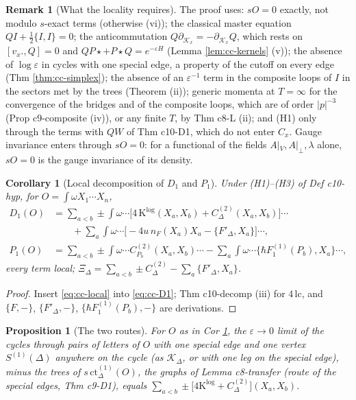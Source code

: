 \documentclass[11pt]{article}
\numberwithin{equation}{section}
\theoremstyle{plain}
\newtheorem{proposition}[theorem]{Proposition}
\newtheorem{corollary}[theorem]{Corollary}
\theoremstyle{definition}
\newtheorem{remark}[theorem]{Remark}
\newcommand{\Ap}{A|_{\perp}}
\newcommand{\AV}{A|_V}
\begin{document}
\begin{remark}[What the locality requires]
\label{rem:cc-requires}
The proof uses: $sO=0$ exactly, not modulo $s$-exact terms (otherwise (vi)); the classical master equation $QI+\tfrac12\{I,I\}=0$; the anticommutation $Q\partial_{\mathcal K_x}=-\partial_{\mathcal K_x}Q$, which rests on $[v_x.,Q]=0$ and $QP\star+P\star Q=e^{-\varepsilon H}$ (Lemma \ref{lem:cc-kernels} (v)); the absence of $\log\varepsilon$ in cycles with one special edge, a property of the cutoff on every edge (Thm \ref{thm:cc-simplex}); the absence of an $\varepsilon^{-1}$ term in the composite loops of $I$ in the sectors met by the trees (Theorem (ii)); generic momenta at $T=\infty$ for the convergence of the bridges and of the composite loops, which are of order $|p|^{-3}$ (Prop c9-composite (iv)), or any finite $T$, by Thm c8-L (ii); and (H1) only through the terms with $QW$ of Thm c10-D1, which do not enter $C_x$. Gauge invariance enters through $sO=0$: for a functional of the fields $\AV,\Ap,\lambda$ alone, $sO=0$ is the gauge invariance of its density.
\end{remark}

\begin{corollary}[Local decomposition of $D_1$ and $P_1$]
\label{cor:cc-D1local}
Under (H1)--(H3) of Def c10-hyp, for $O=\int\omega X_1\cdots X_n$,
\[
\begin{aligned}
D_1(O)&=\sum_{a<b}\pm\int\omega\cdots\Big[4\,\mathrm K^{\log}(X_a,X_b)+C^{(2)}_\Delta(X_a,X_b)\Big]\cdots\\
&\qquad+\sum_a\int\omega\cdots\Big[-4u\,n_F(X_a)X_a-\{F'_\Delta,X_a\}\Big]\cdots,\\
P_1(O)&=\sum_{a<b}\pm\int\omega\cdots C^{(2)}_{P_b}(X_a,X_b)\cdots-\sum_a\int\omega\cdots\big\{\hbar F_1^{(1)}(P_b),X_a\big\}\cdots,
\end{aligned}
\]
every term local; $\Xi_\Delta=\sum_{a<b}\pm C^{(2)}_\Delta-\sum_a\{F'_\Delta,X_a\}$.
\end{corollary}

\begin{proof}
Insert \eqref{eq:cc-local} into \eqref{eq:cc-D1}; Thm c10-decomp (iii) for $4\,\mathrm{lc}$, and $\{F,-\}$, $\{F'_\Delta,-\}$, $\{\hbar F_1^{(1)}(P_b),-\}$ are derivations.
\end{proof}

\begin{proposition}[The two routes]
\label{prop:cc-routes}
For $O$ as in Cor \ref{cor:cc-D1local}, the $\varepsilon\to0$ limit of the cycles through pairs of letters of $O$ with one special edge and one vertex $S^{(1)}(\Delta)$ anywhere on the cycle (as $\mathcal K_\Delta$, or with one leg on the special edge), minus the trees of $s\,\mathrm{ct}^{(1)}_\Delta(O)$, the graphs of Lemma c8-transfer (route of the special edges, Thm c9-D1), equals $\sum_{a<b}\pm\big[4\mathrm K^{\log}+C^{(2)}_\Delta\big](X_a,X_b)$.
\end{proposition}
\end{document}
